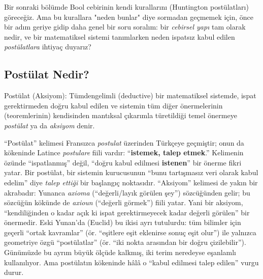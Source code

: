 Bir sonraki bölümde Bool cebirinin kendi kurallarını (Huntington postülatları) göreceğiz.
Ama bu kurallara "neden bunlar" diye sormadan geçmemek için, önce bir adım geriye gidip daha
genel bir soru soralım: bir \emph{cebirsel yapı} tam olarak nedir, ve bir matematiksel sistemi
tanımlarken neden ispatsız kabul edilen \emph{postülatlara} ihtiyaç duyarız?

\subsection{Postülat Nedir?}
\label{sec:postulat-nedir}

\begin{tanim}{Postülat (Aksiyom):}
Tümdengelimli (deductive) bir matematiksel sistemde, ispat gerektirmeden doğru kabul edilen
ve sistemin tüm diğer önermelerinin (teoremlerinin) kendisinden mantıksal çıkarımla
türetildiği temel önermeye \emph{postülat} ya da \emph{aksiyom}
denir.
\end{tanim}

\begin{bilginot}
``Postülat'' kelimesi Fransızca \textit{postulat} üzerinden Türkçeye geçmiştir; onun da
kökeninde Latince \textit{postulare} fiili vardır: ``\textbf{istemek, talep etmek}.''
Kelimenin özünde ``ispatlanmış'' değil, ``doğru kabul edilmesi \textbf{istenen}'' bir önerme
fikri yatar. Bir postülat, bir sistemin kurucusunun ``bunu tartışmasız veri olarak kabul
edelim'' diye \emph{talep ettiği} bir başlangıç noktasıdır. ``Aksiyom'' kelimesi de yakın bir
akrabadır: Yunanca \textit{axioma} (``değerli/layık görülen şey'') sözcüğünden gelir; bu
sözcüğün kökünde de \textit{axioun} (``değerli görmek'') fiili yatar. Yani bir aksiyom,
``kendiliğinden o kadar açık ki ispat gerektirmeyecek kadar değerli görülen'' bir önermedir. Eski Yunan'da (Euclid) bu ikisi ayrı tutulurdu: tüm
bilimler için geçerli ``ortak kavramlar'' (ör. ``eşitlere eşit eklenirse sonuç eşit olur'')
ile yalnızca geometriye özgü ``postülatlar'' (ör. ``iki nokta arasından bir doğru
çizilebilir''). Günümüzde bu ayrım büyük ölçüde kalkmış, iki terim neredeyse eşanlamlı
kullanılıyor. Ama postülatın kökeninde hâlâ o ``kabul edilmesi talep edilen'' vurgu durur.
\end{bilginot}

